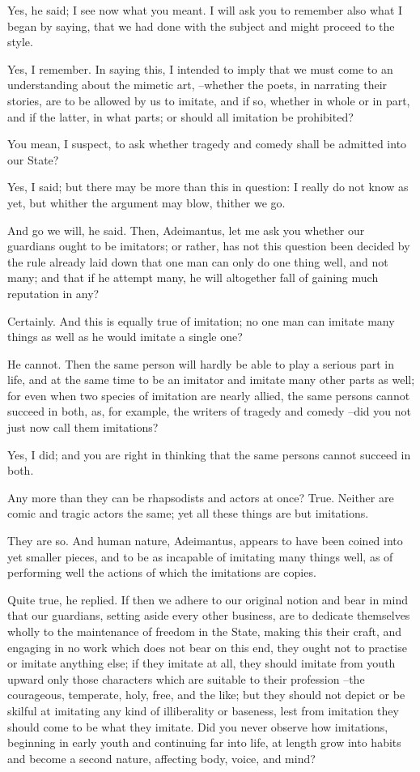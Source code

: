 Yes, he said; I see now what you meant.
I will ask you to remember also what I began by saying, that we had done with the subject and might proceed to the style.

Yes, I remember.
In saying this, I intended to imply that we must come to an understanding about the mimetic art, --whether the poets, in narrating their stories, are to be allowed by us to imitate, and if so, whether in whole or in part, and if the latter, in what parts; or should all imitation be prohibited?

You mean, I suspect, to ask whether tragedy and comedy shall be admitted into our State?

Yes, I said; but there may be more than this in question: I really do not know as yet, but whither the argument may blow, thither we go.

And go we will, he said.
Then, Adeimantus, let me ask you whether our guardians ought to be imitators; or rather, has not this question been decided by the rule already laid down that one man can only do one thing well, and not many; and that if he attempt many, he will altogether fall of gaining much reputation in any?

Certainly.
And this is equally true of imitation; no one man can imitate many things as well as he would imitate a single one?

He cannot.
Then the same person will hardly be able to play a serious part in life, and at the same time to be an imitator and imitate many other parts as well; for even when two species of imitation are nearly allied, the same persons cannot succeed in both, as, for example, the writers of tragedy and comedy --did you not just now call them imitations?

Yes, I did; and you are right in thinking that the same persons cannot succeed in both.

Any more than they can be rhapsodists and actors at once?
True.
Neither are comic and tragic actors the same; yet all these things are but imitations.

They are so.
And human nature, Adeimantus, appears to have been coined into yet smaller pieces, and to be as incapable of imitating many things well, as of performing well the actions of which the imitations are copies.

Quite true, he replied.
If then we adhere to our original notion and bear in mind that our guardians, setting aside every other business, are to dedicate themselves wholly to the maintenance of freedom in the State, making this their craft, and engaging in no work which does not bear on this end, they ought not to practise or imitate anything else; if they imitate at all, they should imitate from youth upward only those characters which are suitable to their profession --the courageous, temperate, holy, free, and the like; but they should not depict or be skilful at imitating any kind of illiberality or baseness, lest from imitation they should come to be what they imitate. Did you never observe how imitations, beginning in early youth and continuing far into life, at length grow into habits and become a second nature, affecting body, voice, and mind?

